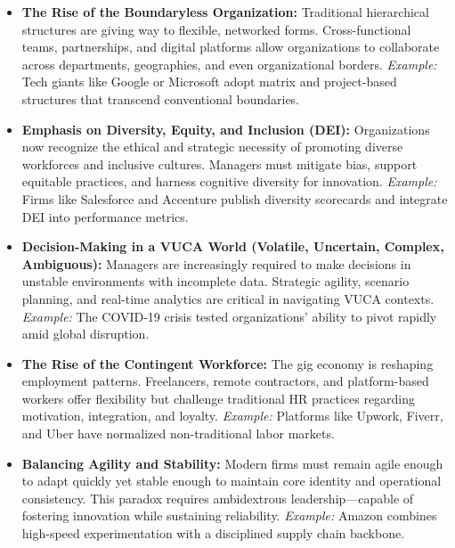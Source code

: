 \documentclass[12pt,a4paper]{book}
\begin{document}
\begin{itemize}

    \item \textbf{The Rise of the Boundaryless Organization:}  
    Traditional hierarchical structures are giving way to flexible, networked forms. Cross-functional teams, partnerships, and digital platforms allow organizations to collaborate across departments, geographies, and even organizational borders.  
    \textit{Example:} Tech giants like Google or Microsoft adopt matrix and project-based structures that transcend conventional boundaries.

    \item \textbf{Emphasis on Diversity, Equity, and Inclusion (DEI):}  
    Organizations now recognize the ethical and strategic necessity of promoting diverse workforces and inclusive cultures. Managers must mitigate bias, support equitable practices, and harness cognitive diversity for innovation.  
    \textit{Example:} Firms like Salesforce and Accenture publish diversity scorecards and integrate DEI into performance metrics.

    \item \textbf{Decision-Making in a VUCA World (Volatile, Uncertain, Complex, Ambiguous):}  
    Managers are increasingly required to make decisions in unstable environments with incomplete data. Strategic agility, scenario planning, and real-time analytics are critical in navigating VUCA contexts.  
    \textit{Example:} The COVID-19 crisis tested organizations' ability to pivot rapidly amid global disruption.

    \item \textbf{The Rise of the Contingent Workforce:}  
    The gig economy is reshaping employment patterns. Freelancers, remote contractors, and platform-based workers offer flexibility but challenge traditional HR practices regarding motivation, integration, and loyalty.  
    \textit{Example:} Platforms like Upwork, Fiverr, and Uber have normalized non-traditional labor markets.

    \item \textbf{Balancing Agility and Stability:}  
    Modern firms must remain agile enough to adapt quickly yet stable enough to maintain core identity and operational consistency. This paradox requires ambidextrous leadership—capable of fostering innovation while sustaining reliability.  
    \textit{Example:} Amazon combines high-speed experimentation with a disciplined supply chain backbone.


\end{itemize}
\end{document}
